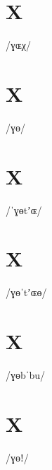 \documentclass[10pt,a4paper,twoside]{book}
\begin{document}
\section*{X}

\begin{multicols}{3}
 {/ɣɶχ/} {}
\end{multicols}

\section*{X}

\begin{multicols}{3}
 {/ɣɵ/} {}
\end{multicols}

\section*{X}

\begin{multicols}{3}
 {/ˈɣɵtʼɶ/} {}
\end{multicols}

\section*{X}

\begin{multicols}{3}
 {/ɣɵˈtʼɶɵ/} {}
\end{multicols}

\section*{X}

\begin{multicols}{3}
 {/ɣɵbˈbu/} {}
\end{multicols}

\section*{X}

\begin{multicols}{3}
 {/ɣɵǃ/} {}
\end{multicols}
\end{document}
